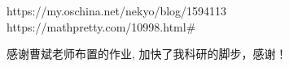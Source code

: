 \documentclass{HEBUTMaster}   %
\begin{document}
\cleardoublepage{}
{}
\begin{thebibliography}{000}

   https://my.oschina.net/nekyo/blog/1594113
   https://mathpretty.com/10998.html#%
  
\end{thebibliography}


\acknowledgement
感谢曹斌老师布置的作业, 加快了我科研的脚步，感谢！


\cleardoublepage
\end{document}
